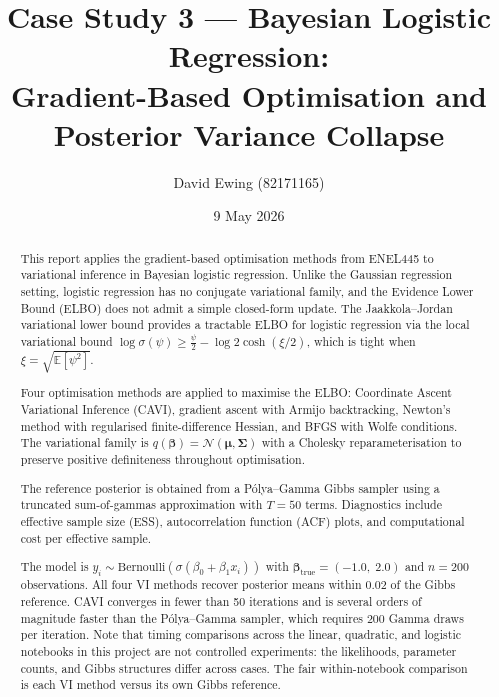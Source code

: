 \documentclass[11pt,a4paper]{article}
\title{
Case Study 3 --- Bayesian Logistic Regression:\\[0.4em]
Gradient-Based Optimisation and Posterior Variance Collapse
}
\author{
  David Ewing (82171165)
}
\date{9 May 2026}
\newcommand{\E}{\mathbb{E}}
\newcommand{\N}{\mathcal{N}}
\begin{document}
\maketitle

\begin{abstract}
\setlength{\parindent}{0pt}
\setlength{\parskip}{0.7em}

This report applies the gradient-based optimisation methods from ENEL445 to variational
inference in Bayesian logistic regression.
Unlike the Gaussian regression setting, logistic regression has no conjugate variational
family, and the Evidence Lower Bound (ELBO) does not admit a simple closed-form update.
The Jaakkola--Jordan \parencite{Jaakkola2000} variational lower bound provides a tractable
ELBO for logistic regression via the local variational bound $\log\sigma(\psi) \geq
\tfrac{\psi}{2} - \log 2\cosh(\xi/2)$, which is tight when $\xi = \sqrt{\E[\psi^2]}$.

Four optimisation methods are applied to maximise the ELBO:
Coordinate Ascent Variational Inference (CAVI), gradient ascent with Armijo backtracking,
Newton's method with regularised finite-difference Hessian, and BFGS with Wolfe conditions.
The variational family is $q(\bm{\beta}) = \N(\bm{\mu},\bm{\Sigma})$ with a
Cholesky reparameterisation to preserve positive definiteness throughout optimisation.

The reference posterior is obtained from a P\'{o}lya--Gamma Gibbs sampler
\parencite{Polson2013} using a truncated sum-of-gammas approximation with $T=50$ terms.
Diagnostics include effective sample size (ESS), autocorrelation function (ACF) plots,
and computational cost per effective sample.

The model is $y_i \sim \mathrm{Bernoulli}(\sigma(\beta_0 + \beta_1 x_i))$
with $\bm{\beta}_{\mathrm{true}} = (-1.0,\; 2.0)$ and $n=200$ observations.
All four VI methods recover posterior means within $0.02$ of the Gibbs reference.
CAVI converges in fewer than 50 iterations and is several orders of magnitude faster
than the P\'{o}lya--Gamma sampler, which requires $200$ Gamma draws per iteration.
Note that timing comparisons across the linear, quadratic, and logistic notebooks
in this project are not controlled experiments: the likelihoods, parameter counts,
and Gibbs structures differ across cases.
The fair within-notebook comparison is each VI method versus its own Gibbs reference.
\end{abstract}

\newpage

\end{document}
